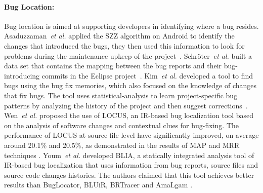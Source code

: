 \documentclass[a4paper, 12pt]{book}
\begin{document}
\paragraph{Bug Location:} Bug location is aimed at supporting developers in identifying where a bug resides.
Asaduzzaman~\emph{et al.} applied the SZZ algorithm on Android to identify the changes that introduced the bugs, they then used this information to look for problems during the maintenance upkeep of the project~\cite{asaduzzaman2012bug}. Schr{\"o}ter~\emph{et al.} built a data set that contains the mapping between the bug reports and their bug-introducing commits in the Eclipse project~\cite{schroter2006if}. Kim~\emph{et al.} developed a tool to find bugs using the bug fix memories, which also focused on the knowledge of changes that fix bugs. The tool uses statistical-analysis to learn project-specific bug patterns by analyzing the history of the project and then suggest corrections~\cite{kim2006memories}. Wen~\textit{et al.} proposed the use of LOCUS, an IR-based bug localization tool based on the analysis of software changes and contextual clues for bug-fixing. The performance of LOCUS at source file level have  significantly improved, on average around 20.1\% and 20.5\%, as demonstrated in the results of MAP and MRR techniques \cite{wen2016locus}. Youm~\textit{et al.} developed BLIA, a statically integrated analysis tool of IR-based bug localization that uses information from bug reports, source files and source code changes histories. The authors claimed that this tool achieves better results than BugLocator, BLUiR, BRTracer and AmaLgam \cite{youm2015bug}.
\end{document}
